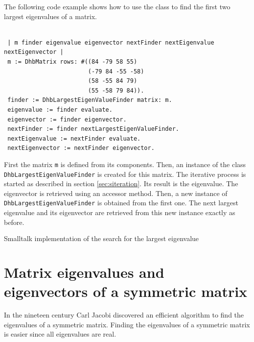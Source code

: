 \documentclass[twoside]{book}
\begin{document}
The following code example shows how to use the class to find the
first two largest eigenvalues of a matrix.
\begin{codeExample}
\begin{verbatim}

 | m finder eigenvalue eigenvector nextFinder nextEigenvalue nextEigenvector |
 m := DhbMatrix rows: #((84 -79 58 55)
                        (-79 84 -55 -58)
                        (58 -55 84 79)
                        (55 -58 79 84)).
 finder := DhbLargestEigenValueFinder matrix: m.
 eigenvalue := finder evaluate.
 eigenvector := finder eigenvector.
 nextFinder := finder nextLargestEigenValueFinder.
 nextEigenvalue := nextFinder evaluate.
 nextEigenvector := nextFinder eigenvector.
\end{verbatim}
\end{codeExample}
First the matrix {\tt m} is defined from its components. Then, an
instance of the class {\tt DhbLargestEigenValueFinder} is created
for this matrix. The iterative process is started as described in
section \ref{sec:siteration}. Its result is the eigenvalue. The
eigenvector is retrieved using an accessor method. Then, a new
instance of {\tt DhbLargestEigenValueFinder} is obtained from the
first one. The next largest eigenvalue and its eigenvector are
retrieved from this new instance exactly as before.

\begin{listing} Smalltalk implementation of the search for the largest eigenvalue
\label{ls:eigenlarge}

\end{listing}


\section{Matrix eigenvalues and eigenvectors of a symmetric matrix}
\label{sec:eigensym}
In the nineteen century Carl Jacobi discovered an efficient
algorithm to find the eigenvalues of a symmetric matrix. Finding
the eigenvalues of a symmetric matrix is easier since all
eigenvalues are real.
\end{document}

